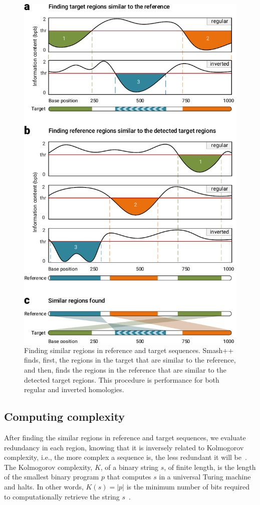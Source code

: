 \documentclass[a4paper,num-refs]{oup-contemporary}
\begin{document}
 \begin{figure}[!h]
   \centering
   \includegraphics[width=\columnwidth]{fig/simil.pdf}
   \caption{Finding similar regions in reference and target sequences. Smash++ finds, first, the regions in the target that are similar to the reference, and then, finds the regions in the reference that are similar to the detected target regions. This procedure is performance for both regular and inverted homologies.}
   \label{fig.simil}
 \end{figure}

 \subsection{Computing complexity}
 After finding the similar regions in reference and target sequences, we evaluate redundancy in each region, knowing that it is inversely related to Kolmogorov complexity, i.e., the more complex a sequence is, the less redundant it will be~\cite{hosseini2018cryfa}. The Kolmogorov complexity, $K$, of a binary string $s$, of finite length, is the length of the smallest binary program $p$ that computes $s$ in a universal Turing machine and halts. In other words, $K(s)=|p|$ is the minimum number of bits required to computationally retrieve the string $s$~\cite{turing1936on,li2009an}.
\end{document}

